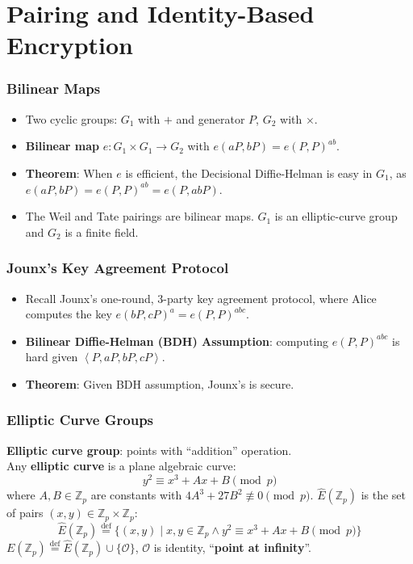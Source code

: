 \section{Pairing and Identity-Based Encryption}
\begin{frame}\frametitle{Bilinear Maps}
\begin{itemize}
\item Two cyclic groups: $G_1$ with $+$ and generator $P$, $G_2$ with $\times$.
\item \textbf{Bilinear map} $e: G_1 \times G_1 \to G_2$ with $e(aP, bP)=e(P,P)^{ab}$. 
\item \textbf{Theorem}: When $e$ is efficient, the Decisional Diffie-Helman is easy in $G_1$, as $e(aP, bP) = e(P, P)^{ab} = e(P, abP)$.
\item The Weil and Tate pairings are bilinear maps. $G_1$ is an elliptic-curve group and $G_2$ is a finite field.
\end{itemize}
\begin{figure}
\begin{center}

\end{center}
\end{figure}
\end{frame}
\begin{frame}\frametitle{Jounx's Key Agreement Protocol}
\begin{figure}
\begin{center}

\end{center}
\end{figure}
\begin{itemize}
\item Recall Jounx's one-round, 3-party key agreement protocol, where
Alice computes the key $e(bP, cP)^a = e(P, P)^{abc}$.
\item \textbf{Bilinear Diffie-Helman (BDH) Assumption}: computing $e(P, P)^{abc}$ is hard given $\left<P, aP, bP, cP \right>$.
\item \textbf{Theorem}: Given BDH assumption, Jounx's is secure.
\end{itemize}
\end{frame}
\begin{frame}\frametitle{Elliptic Curve Groups}
\textbf{Elliptic curve group}: points with ``addition'' operation.\\
Any \textbf{elliptic curve} is a plane algebraic curve:
\[ y^2 \equiv x^3 + Ax + B \pmod p\]
where $A,B \in \mathbb{Z}_p$ are constants with $4A^3 + 27B^2\not \equiv 0 \pmod p$.
$\hat{E}(\mathbb{Z}_p)$ is the set of pairs $(x,y) \in \mathbb{Z}_p \times \mathbb{Z}_p$:
\[ \hat{E}(\mathbb{Z}_p) \overset{\text{def}}{=} \{(x,y) \mid x,y\in \mathbb{Z}_p \land y^2 \equiv x^3 + Ax + B \pmod p \}\]
$E(\mathbb{Z}_p) \overset{\text{def}}{=} \hat{E}(\mathbb{Z}_p)\cup \{\mathcal{O}\}$, $\mathcal{O}$ is identity, ``\textbf{point at infinity}''.
\end{frame}
